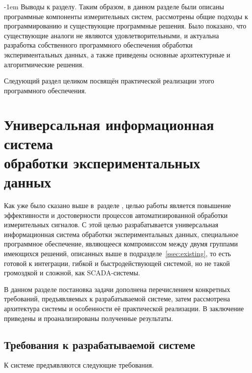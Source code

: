 \documentclass[a4paper, 14pt, titlepage]{extarticle}
\makeatletter
\let\oldsection\section
\renewcommand{\section}{\newpage\oldsection}
\renewcommand{\paragraph}{%
    \@startsection{paragraph}{4}%
    {\parindent}{\z@}{-1em}%
    {\normalfont\normalsize\bfseries}%
  }
\makeatother
\begin{document}
  \paragraph{Выводы к разделу.}
  Таким образом, в данном разделе были описаны программные компоненты измерительных систем,
  рассмотрены общие подходы к программированию и существующие программные решения. Было показано,
  что существующие аналоги не являются удовлетворительными, и актуальна разработка собственного
  программного обеспечения обработки экспериментальных данных, а также приведены основные
  архитектурные и алгоритмические решения.

  Следующий раздел целиком посвящён практической реализации этого программного обеспечения.

  \section[Универсальная информационная система обработки экспериментальных данных]%
          {Универсальная информационная система\\обработки экспериментальных данных}\label{sec:my-system}

  Как уже было сказано выше в~разделе ,
  целью работы является повышение эффективности и достоверности процессов автоматизированной
  обработки измерительных сигналов. С этой целью разрабатывается универсальная информационная
  система обработки экспериментальных данных,
  специальное программное обеспечение,
  являющееся компромиссом между двумя группами имеющихся решений, описанных выше в
  подразделе~\ref{ssec:existing}, то есть готовой к интеграции, гибкой и быстродействующей системой, но не такой
  громоздкой и сложной, как SCADA-системы.

  В данном разделе постановка задачи дополнена перечислением конкретных требований, предъявляемых к
  разрабатываемой системе, затем рассмотрена архитектура системы и особенности её практической
  реализации. В заключение приведены и проанализированы полученные результаты.


  \subsection{Требования к разрабатываемой системе}\label{ssec:requirements}

  К системе предъявляются следующие требования.
\end{document}
